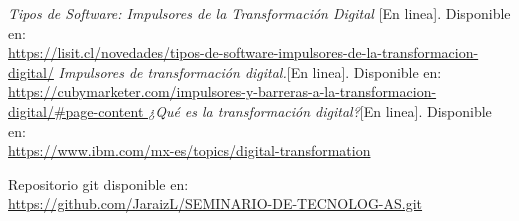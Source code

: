 \documentclass[12pt]{article}
\begin{document}
\begin{thebibliography}{9}
\textit{Tipos de Software: Impulsores de la Transformación Digital} [En linea]. Disponible en:\\ \url{https://lisit.cl/novedades/tipos-de-software-impulsores-de-la-transformacion-digital/}
\textit{Impulsores de transformación digital.}[En linea]. Disponible en:\\ \url{https://cubymarketer.com/impulsores-y-barreras-a-la-transformacion-digital/#page-content }
\textit{¿Qué es la transformación digital?}[En linea]. Disponible en:\\ \url{https://www.ibm.com/mx-es/topics/digital-transformation}
\end{thebibliography}
Repositorio git disponible en:\\ \url{https://github.com/JaraizL/SEMINARIO-DE-TECNOLOG-AS.git}
\end{document}
